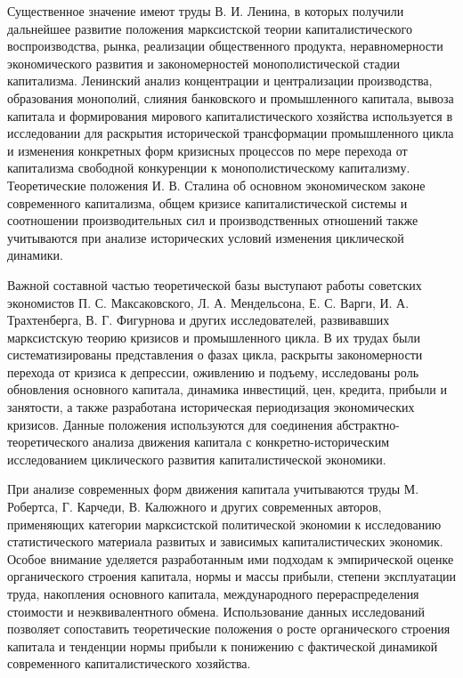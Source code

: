 Существенное значение имеют труды В. И. Ленина, в которых получили дальнейшее развитие положения марксистской теории капиталистического воспроизводства, рынка, реализации общественного продукта, неравномерности экономического развития и закономерностей монополистической стадии капитализма. Ленинский анализ концентрации и централизации производства, образования монополий, слияния банковского и промышленного капитала, вывоза капитала и формирования мирового капиталистического хозяйства используется в исследовании для раскрытия исторической трансформации промышленного цикла и изменения конкретных форм кризисных процессов по мере перехода от капитализма свободной конкуренции к монополистическому капитализму. Теоретические положения И. В. Сталина об основном экономическом законе современного капитализма, общем кризисе капиталистической системы и соотношении производительных сил и производственных отношений также учитываются при анализе исторических условий изменения циклической динамики.

Важной составной частью теоретической базы выступают работы советских экономистов П. С. Максаковского, Л. А. Мендельсона, Е. С. Варги, И. А. Трахтенберга, В. Г. Фигурнова и других исследователей, развивавших марксистскую теорию кризисов и промышленного цикла. В их трудах были систематизированы представления о фазах цикла, раскрыты закономерности перехода от кризиса к депрессии, оживлению и подъему, исследованы роль обновления основного капитала, динамика инвестиций, цен, кредита, прибыли и занятости, а также разработана историческая периодизация экономических кризисов. Данные положения используются для соединения абстрактно-теоретического анализа движения капитала с конкретно-историческим исследованием циклического развития капиталистической экономики.

При анализе современных форм движения капитала учитываются труды М. Робертса, Г. Карчеди, В. Калюжного и других современных авторов, применяющих категории марксистской политической экономии к исследованию статистического материала развитых и зависимых капиталистических экономик. Особое внимание уделяется разработанным ими подходам к эмпирической оценке органического строения капитала, нормы и массы прибыли, степени эксплуатации труда, накопления основного капитала, международного перераспределения стоимости и неэквивалентного обмена. Использование данных исследований позволяет сопоставить теоретические положения о росте органического строения капитала и тенденции нормы прибыли к понижению с фактической динамикой современного капиталистического хозяйства.


